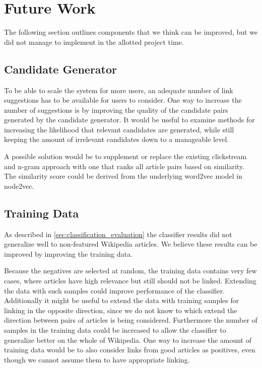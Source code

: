 \chapter{Future Work}\label{sec:future_work}
The following section outlines components that we think can be improved, but we did not manage to implement in the allotted project time.

\section{Candidate Generator}
To be able to scale the system for more users, an adequate number of link suggestions has to be available for users to consider. One way to increase the number of suggestions is by improving the quality of the candidate pairs generated by the candidate generator. It would be useful to examine methods for increasing the likelihood that relevant candidates are generated, while still keeping the amount of irrelevant candidates down to a manageable level.

A possible solution would be to supplement or replace the existing clickstream and n-gram approach with one that ranks all article pairs based on similarity. The similarity score could be derived from the underlying word2vec model in node2vec.

\section{Training Data}
As described in \cref{sec:classification_evaluation} the classifier results did not generalize well to non-featured Wikipedia articles. We believe these results can be improved by improving the training data.

Because the negatives are selected at random, the training data contains very few cases, where articles have high relevance but still should not be linked. Extending the data with such samples could improve performance of the classifier. Additionally it might be useful to extend the data with training samples for linking in the opposite direction, since we do not know to which extend the direction between pairs of articles is being considered. Furthermore the number of samples in the training data could be increased to allow the classifier to generalize better on the whole of Wikipedia. One way to increase the amount of training data would be to also consider links from good articles as positives, even though we cannot assume them to have appropriate linking.

